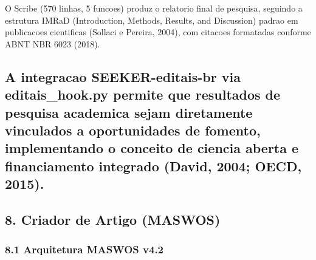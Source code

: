 \documentclass[
  12pt,
]{article}
\begin{document}
O Scribe (570 linhas, 5 funcoes) produz o relatorio final de pesquisa,
seguindo a estrutura IMRaD (Introduction, Methods, Results, and
Discussion) padrao em publicacoes cientificas (Sollaci e Pereira, 2004),
com citacoes formatadas conforme ABNT NBR 6023 (2018).

\subsection{A integracao SEEKER-editais-br via editais\_hook.py permite
que resultados de pesquisa academica sejam diretamente vinculados a
oportunidades de fomento, implementando o conceito de ciencia aberta e
financiamento integrado (David, 2004; OECD,
2015).}\label{a-integracao-seeker-editais-br-via-editais_hook.py-permite-que-resultados-de-pesquisa-academica-sejam-diretamente-vinculados-a-oportunidades-de-fomento-implementando-o-conceito-de-ciencia-aberta-e-financiamento-integrado-david-2004-oecd-2015.}

\subsection{8. Criador de Artigo
(MASWOS)}\label{criador-de-artigo-maswos}

\subsubsection{8.1 Arquitetura MASWOS
v4.2}\label{arquitetura-maswos-v4.2}
\end{document}

